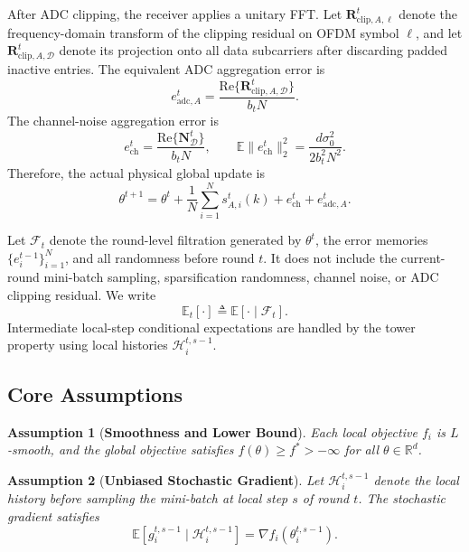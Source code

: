 \documentclass[conference]{IEEEtran}
\newtheorem{assumption}{Assumption}
\begin{document}
After ADC clipping, the receiver applies a unitary FFT. Let $\mathbf{R}_{\mathrm{clip},A,\ell}^t$ denote the frequency-domain transform of the clipping residual on OFDM symbol $\ell$, and let $\mathbf{R}_{\mathrm{clip},A,\mathcal{D}}^t$ denote its projection onto all data subcarriers after discarding padded inactive entries. The equivalent ADC aggregation error is
\begin{equation}
    e_{\mathrm{adc},A}^t
    =\frac{\mathrm{Re}\{\mathbf{R}_{\mathrm{clip},A,\mathcal{D}}^t\}}{b_tN}.
\end{equation}
The channel-noise aggregation error is
\begin{equation}
    e_{\mathrm{ch}}^t=\frac{\mathrm{Re}\{\mathbf{N}_{\mathcal{D}}^t\}}{b_tN},
    \qquad
    \mathbb{E}\|e_{\mathrm{ch}}^t\|_2^2
    =\frac{d\sigma_0^2}{2b_t^2N^2}.
\end{equation}
Therefore, the actual physical global update is
\begin{equation}
    \label{eqn:physical_update_adc}
    \theta^{t+1}
    =\theta^t+\frac1N\sum_{i=1}^{N}s_{A,i}^t(k)
    +e_{\mathrm{ch}}^t+e_{\mathrm{adc},A}^t.
\end{equation}

Let $\mathcal{F}_t$ denote the round-level filtration generated by $\theta^t$, the error memories $\{e_i^{t-1}\}_{i=1}^{N}$, and all randomness before round $t$. It does not include the current-round mini-batch sampling, sparsification randomness, channel noise, or ADC clipping residual. We write
\begin{equation}
    \mathbb{E}_t[\cdot]\triangleq \mathbb{E}[\cdot\mid\mathcal{F}_t].
\end{equation}
Intermediate local-step conditional expectations are handled by the tower property using local histories $\mathcal{H}_i^{t,s-1}$.

\subsection{Core Assumptions}

\begin{assumption}[\bf Smoothness and Lower Bound]
    \label{assum:smoothness}
    Each local objective $f_i$ is $L$-smooth, and the global objective satisfies $f(\theta)\ge f^*>-\infty$ for all $\theta\in\mathbb{R}^d$.
\end{assumption}

\begin{assumption}[\bf Unbiased Stochastic Gradient]
    \label{assum:unbiased}
    Let $\mathcal{H}_{i}^{t,s-1}$ denote the local history before sampling the mini-batch at local step $s$ of round $t$. The stochastic gradient satisfies
    \begin{equation}
        \mathbb{E}\left[g_i^{t,s-1}\mid\mathcal{H}_{i}^{t,s-1}\right]
        =\nabla f_i(\theta_i^{t,s-1}).
    \end{equation}
\end{assumption}
\end{document}
